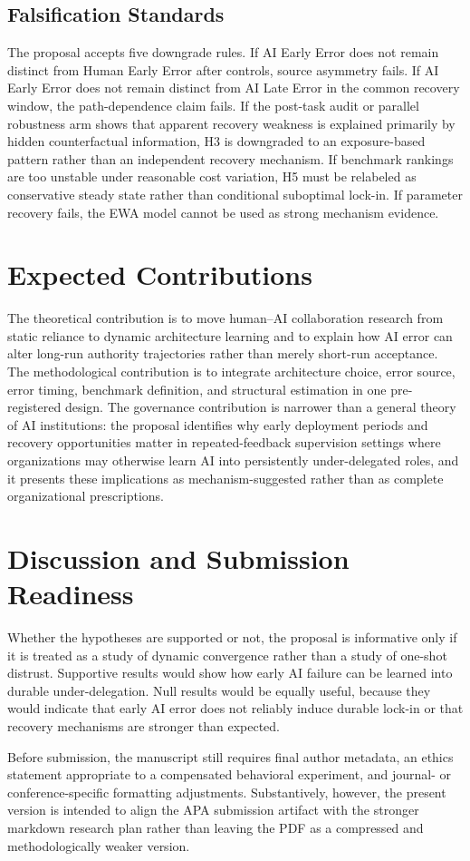 \documentclass[man,natbib]{apa7}
\begin{document}
\subsection{Falsification Standards}

The proposal accepts five downgrade rules. If AI Early Error does not remain distinct from Human Early Error after controls, source asymmetry fails. If AI Early Error does not remain distinct from AI Late Error in the common recovery window, the path-dependence claim fails. If the post-task audit or parallel robustness arm shows that apparent recovery weakness is explained primarily by hidden counterfactual information, H3 is downgraded to an exposure-based pattern rather than an independent recovery mechanism. If benchmark rankings are too unstable under reasonable cost variation, H5 must be relabeled as conservative steady state rather than conditional suboptimal lock-in. If parameter recovery fails, the EWA model cannot be used as strong mechanism evidence.

\section{Expected Contributions}

The theoretical contribution is to move human--AI collaboration research from static reliance to dynamic architecture learning and to explain how AI error can alter long-run authority trajectories rather than merely short-run acceptance. The methodological contribution is to integrate architecture choice, error source, error timing, benchmark definition, and structural estimation in one pre-registered design. The governance contribution is narrower than a general theory of AI institutions: the proposal identifies why early deployment periods and recovery opportunities matter in repeated-feedback supervision settings where organizations may otherwise learn AI into persistently under-delegated roles, and it presents these implications as mechanism-suggested rather than as complete organizational prescriptions.

\section{Discussion and Submission Readiness}

Whether the hypotheses are supported or not, the proposal is informative only if it is treated as a study of dynamic convergence rather than a study of one-shot distrust. Supportive results would show how early AI failure can be learned into durable under-delegation. Null results would be equally useful, because they would indicate that early AI error does not reliably induce durable lock-in or that recovery mechanisms are stronger than expected.

Before submission, the manuscript still requires final author metadata, an ethics statement appropriate to a compensated behavioral experiment, and journal- or conference-specific formatting adjustments. Substantively, however, the present version is intended to align the APA submission artifact with the stronger markdown research plan rather than leaving the PDF as a compressed and methodologically weaker version.


\end{document}
